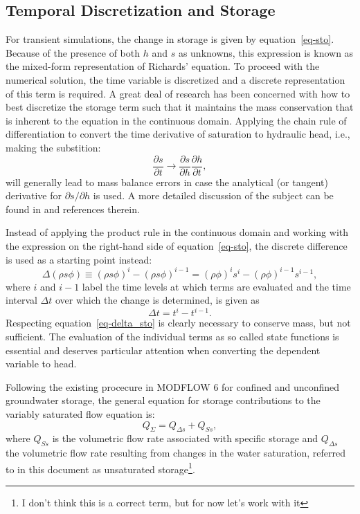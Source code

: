 \documentclass[fleqn]{article}
\begin{document}
\subsection{Temporal Discretization and Storage}
For transient simulations, the change in storage is given by
equation~\ref{eq-sto}. Because of the presence of both $h$ and
$s$ as unknowns, this expression is known as the mixed-form
representation of Richards' equation. To proceed with the
numerical solution, the time variable is discretized and a
discrete representation of this term is required. 
A great deal of research has been concerned with how to 
best discretize the storage term such that it maintains
the mass conservation that is inherent to the equation in
the continuous domain. Applying the chain rule of differentiation
to convert the time derivative of saturation to hydraulic head,
i.e., making the substition:
\begin{equation}
  \frac{\partial s}{\partial t} \rightarrow
  \frac{\partial s}{\partial h} 
  \frac{\partial h}{\partial t},
  \label{eq-sat-chain-rule}
\end{equation}
will generally lead to mass balance errors in case the analytical
(or tangent) derivative for $\partial s/\partial h$ is used. 
A more detailed discussion of the subject can be found in
\cite{rathfelder-1994} and references therein.

Instead of applying the product rule in the continuous domain
and working with the expression on the right-hand side of 
equation~\ref{eq-sto}, the discrete difference is used
as a starting point instead:
\begin{equation}
  \Delta \left ( \rho s \phi \right ) \equiv
  \left ( \rho s \phi \right )^{i} - 
  \left ( \rho s \phi \right )^{i-1} =
  \left ( \rho \phi \right )^{i} s^{i} - 
  \left ( \rho \phi \right )^{i-1} s^{i-1},
  \label{eq-delta_sto}
\end{equation}
where $i$ and $i-1$ label the time levels at which terms
are evaluated and the time interval $\Delta t$ over which the 
change is determined, is given as
\begin{equation}
  \Delta t = t^i - t^{i-1}.
\end{equation}
Respecting equation~\ref{eq-delta_sto} is clearly necessary to conserve
mass, but not sufficient. The evaluation of the individual terms
as so called state functions is essential and deserves particular
attention when converting the dependent variable to head.

Following the existing procecure in MODFLOW 6 for confined and
unconfined groundwater storage, the general equation for storage
contributions to the variably saturated flow equation is:
\begin{equation}
  Q_{\Sigma} = Q_{\Delta s} + Q_{Ss},
\end{equation}
where $Q_{Ss}$ is the volumetric flow rate associated with specific
storage and $Q_{\Delta s}$ the volumetric flow rate resulting from
changes in the water saturation, referred to in this document
as unsaturated storage\footnote{
  I don't think this is a correct term,
  but for now let's work with it
}.
\end{document}
